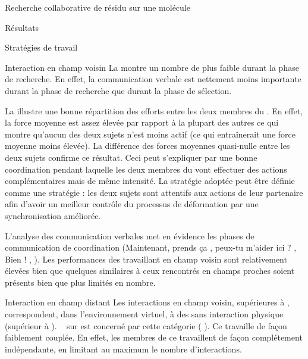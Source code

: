 \documentclass[myfrancais]{mythesis}
\begin{document}
\begin{mychapter}{Recherche collaborative de résidu sur une molécule}
\begin{mysection}{Résultats}
\begin{mysubsection}{Stratégies de travail}
\begin{mysubsubsection}{Interaction en champ voisin}
					La  montre un nombre de  plus faible durant la phase de recherche.
					En effet, la communication verbale est nettement moins importante durant la phase de recherche que durant la phase de sélection.

					La  illustre une bonne répartition des efforts entre les deux membres du .
					En effet, la force moyenne est assez élevée par rapport à la plupart des autres  ce qui montre qu'aucun des deux sujets n'est moins actif (ce qui entraînerait une force moyenne moins élevée).
					La différence des forces moyennes quasi-nulle entre les deux sujets confirme ce résultat.
					Ceci peut s'expliquer par une bonne coordination pendant laquelle les deux membres du  vont effectuer des actions complémentaires mais de même intensité.
					La stratégie adoptée peut être définie comme une stratégie  : les deux sujets sont attentifs aux actions de leur partenaire afin d'avoir un meilleur contrôle du processus de déformation par une synchronisation améliorée.

					L'analyse des communication verbales met en évidence les phases de communication de coordination (\og Maintenant, prends ça \fg, \og peux-tu m'aider ici ? \fg, \og Bien ! \fg, \myetc).
					Les performances des  travaillant en champ voisin sont relativement élevées bien que quelques  similaires à ceux rencontrés en champs proches soient présents bien que plus limités en nombre.
				\end{mysubsubsection}
				\begin{mysubsubsection}{Interaction en champ distant}
					Les interactions en champ voisin, supérieures à , correspondent, dans l'environnement virtuel, à des  sans interaction physique (supérieur à ).
					~ sur  est concerné par cette catégorie ( ).
					Ce  travaille de façon faiblement couplée.
					En effet, les membres de ce  travaillent de façon complétement indépendante, en limitant au maximum le nombre d'interactions.


\end{mysubsubsection}
\end{mysubsection}
\end{mysection}
\end{mychapter}
\end{document}
